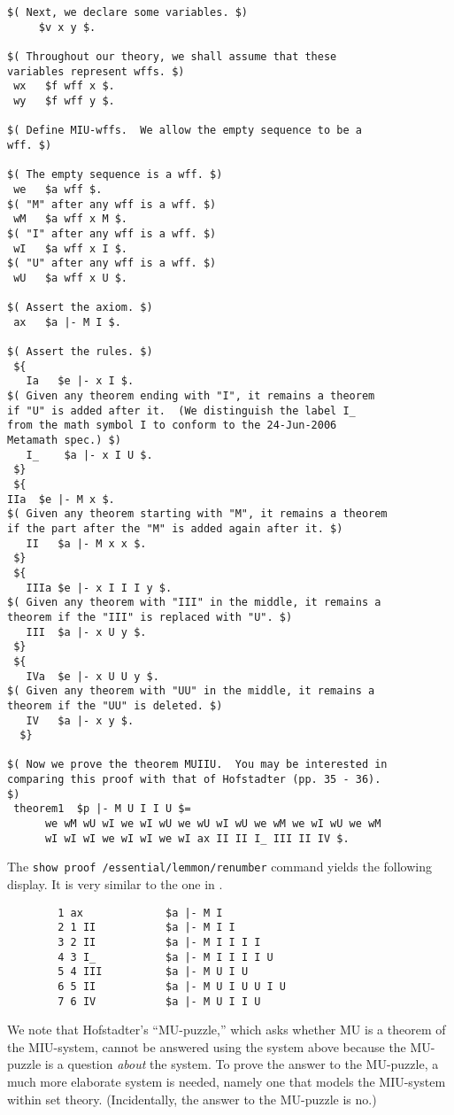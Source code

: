 \begin{verbatim}
$( Next, we declare some variables. $)
     $v x y $.

$( Throughout our theory, we shall assume that these
variables represent wffs. $)
 wx   $f wff x $.
 wy   $f wff y $.

$( Define MIU-wffs.  We allow the empty sequence to be a
wff. $)

$( The empty sequence is a wff. $)
 we   $a wff $.
$( "M" after any wff is a wff. $)
 wM   $a wff x M $.
$( "I" after any wff is a wff. $)
 wI   $a wff x I $.
$( "U" after any wff is a wff. $)
 wU   $a wff x U $.

$( Assert the axiom. $)
 ax   $a |- M I $.

$( Assert the rules. $)
 ${
   Ia   $e |- x I $.
$( Given any theorem ending with "I", it remains a theorem
if "U" is added after it.  (We distinguish the label I_
from the math symbol I to conform to the 24-Jun-2006
Metamath spec.) $)
   I_    $a |- x I U $.
 $}
 ${
IIa  $e |- M x $.
$( Given any theorem starting with "M", it remains a theorem
if the part after the "M" is added again after it. $)
   II   $a |- M x x $.
 $}
 ${
   IIIa $e |- x I I I y $.
$( Given any theorem with "III" in the middle, it remains a
theorem if the "III" is replaced with "U". $)
   III  $a |- x U y $.
 $}
 ${
   IVa  $e |- x U U y $.
$( Given any theorem with "UU" in the middle, it remains a
theorem if the "UU" is deleted. $)
   IV   $a |- x y $.
  $}

$( Now we prove the theorem MUIIU.  You may be interested in
comparing this proof with that of Hofstadter (pp. 35 - 36).
$)
 theorem1  $p |- M U I I U $=
      we wM wU wI we wI wU we wU wI wU we wM we wI wU we wM
      wI wI wI we wI wI we wI ax II II I_ III II IV $.
\end{verbatim}

The \texttt{show proof /essential/lemmon/renumber} command
yields the following display.  It is very similar
to the one in \cite[pp.~35--36]{Hofstadter}.

\begin{verbatim}
        1 ax             $a |- M I
        2 1 II           $a |- M I I
        3 2 II           $a |- M I I I I
        4 3 I_           $a |- M I I I I U
        5 4 III          $a |- M U I U
        6 5 II           $a |- M U I U U I U
        7 6 IV           $a |- M U I I U
\end{verbatim}

We note that Hofstadter's ``MU-puzzle,'' which asks whether
MU is a theorem of the MIU-system, cannot be answered using
the system above because the MU-puzzle is a question {\em
about} the system.  To prove the answer to the MU-puzzle,
a much more elaborate system is needed, namely one that
models the MIU-system within set theory.  (Incidentally, the
answer to the MU-puzzle is no.)

